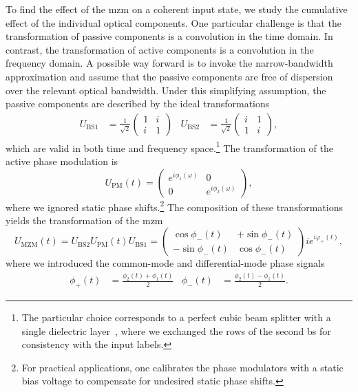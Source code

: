 To find the effect of the \gls{mzm} on a coherent input state, we study the cumulative effect of the individual optical components.
One particular challenge is that the transformation of passive components is a convolution in the time domain.
In contrast, the transformation of active components is a convolution in the frequency domain.
A possible way forward is to invoke the narrow-bandwidth approximation and assume that the passive components are free of dispersion over the relevant optical bandwidth.
Under this simplifying assumption, the passive components are described by the ideal transformations
\begin{align}
	U_\text{BS1}
	&=
	\frac{1}{\sqrt{2}}
	\begin{pmatrix}
		1 & i \\
		i & 1
	\end{pmatrix}
	&
	U_\text{BS2}
	&=
	\frac{1}{\sqrt{2}}
	\begin{pmatrix}
		i & 1 \\
		1 & i
	\end{pmatrix}
	,
\end{align}
which are valid in both time and frequency space.\footnote{The particular choice corresponds to a perfect cubic beam splitter with a single dielectric layer~\cite[p.~139]{Gerry2005}, where we exchanged the rows of the second \gls{bs} for consistency with the input labels.}
The transformation of the active phase modulation is
\begin{equation}
	U_\text{PM}(t)
	=
	\begin{pmatrix}
		e^{i\phi_1(\omega)} & 0 \\
		0 & e^{i\phi_2(\omega)}
	\end{pmatrix}
	,
\end{equation}
where we ignored static phase shifts.\footnote{For practical applications, one calibrates the phase modulators with a static bias voltage to compensate for undesired static phase shifts.}
The composition of these transformations yields the transformation of the \gls{mzm}
\begin{equation}
	U_\text{MZM}(t)
	=
	U_\text{BS2}
	U_\text{PM}(t)
	U_\text{BS1}
	=
	\begin{pmatrix}
		\cos\phi_-(t) & +\sin\phi_-(t) \\
		-\sin\phi_-(t) & \cos\phi_-(t)
	\end{pmatrix}
	ie^{i\varphi_+(t)}
	\label{eq:mzm_matrix}
	,
\end{equation}
where we introduced the common-mode and differential-mode phase signals
\begin{align}
	\phi_+(t)
	&=
	\frac{\phi_2(t)+\phi_1(t)}{2}
	&
	\phi_-(t)
	&=
	\frac{\phi_2(t)-\phi_1(t)}{2}
	.
\end{align}
